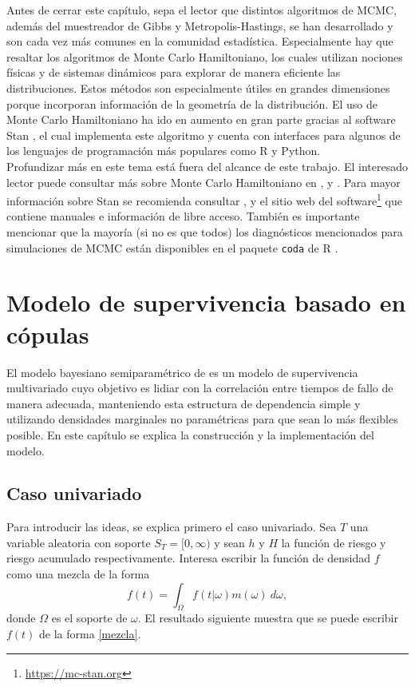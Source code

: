 \documentclass[11pt,a4paper]{article}
\begin{document}
Antes de cerrar este capítulo, sepa el lector que distintos algoritmos de MCMC, además del muestreador de Gibbs y Metropolis-Hastings, se han desarrollado y son cada vez más comunes en la comunidad estadística. Especialmente hay que resaltar los algoritmos de Monte Carlo Hamiltoniano, los cuales utilizan nociones físicas y de sistemas dinámicos para explorar de manera eficiente las distribuciones. Estos métodos son especialmente útiles en grandes dimensiones porque incorporan información de la geometría de la distribución. El uso de Monte Carlo Hamiltoniano ha ido en aumento en gran parte gracias al software Stan \citep{stan}, el cual implementa este algoritmo y cuenta con interfaces para algunos de los lenguajes de programación más populares como R y Python.\\

Profundizar más en este tema está fuera del alcance de este trabajo. El interesado lector puede consultar más sobre Monte Carlo Hamiltoniano en \citet{neal}, \citet{betancourt} y \citet{gelman}. Para mayor información sobre Stan se recomienda consultar \citet{gelman}, \citet{kruschke} y el sitio web del software\footnote{ \url{https://mc-stan.org}} que contiene manuales e información de libre acceso. También es importante mencionar 
que la mayoría (si no es que todos) los diagnósticos mencionados para simulaciones de MCMC están disponibles en el paquete \texttt{coda} de R \citep{coda}.\\

\newpage

\section{Modelo de supervivencia basado en cópulas}
\label{elmodelo}

El modelo bayesiano semiparamétrico de \citet{nieto} es un modelo de supervivencia multivariado cuyo objetivo es lidiar con la correlación entre tiempos de fallo de manera adecuada, manteniendo esta estructura de dependencia simple y utilizando densidades marginales no paramétricas para que sean lo más flexibles posible. En este capítulo se explica la construcción y la implementación del modelo.\\

\subsection{Caso univariado}

Para introducir las ideas, se explica primero el caso univariado. Sea $T$ una variable aleatoria con soporte $S_T = [0, \infty)$ y sean $h$ y $H$ la función de riesgo y riesgo acumulado respectivamente. Interesa escribir la función de densidad $f$ como una mezcla de la forma
\begin{equation} \label{mezcla}
f(t) = \int_\Omega f(t|\omega)m(\omega) \ d\omega,
\end{equation}
donde $\Omega$ es el soporte de $\omega$. El resultado siguiente muestra que se puede escribir $f(t)$ de la forma \eqref{mezcla}.
\end{document}
